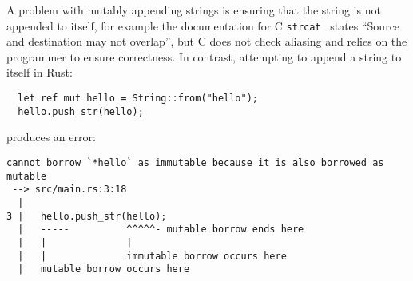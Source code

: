 A problem with mutably appending strings is ensuring that the string
is not appended to itself, for example the documentation for
C \verb|strcat|~\cite{strcat} states ``Source and destination may not
overlap'', but C does not check aliasing and relies on the programmer
to ensure correctness. In contrast, attempting to append a string
to itself in Rust:
\begin{verbatim}
  let ref mut hello = String::from("hello");
  hello.push_str(hello);
\end{verbatim}
produces an error:
\begin{verbatim}
cannot borrow `*hello` as immutable because it is also borrowed as mutable
 --> src/main.rs:3:18
  |
3 |   hello.push_str(hello);
  |   -----          ^^^^^- mutable borrow ends here
  |   |              |
  |   |              immutable borrow occurs here
  |   mutable borrow occurs here
\end{verbatim}
